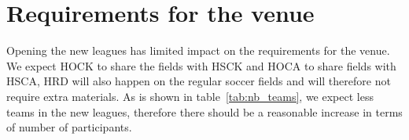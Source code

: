 \documentclass{article}
\begin{document}
\section{Requirements for the venue}

Opening the new leagues has limited impact on the requirements for the venue.
We expect HOCK to share the fields with HSCK and HOCA to share fields with HSCA,
HRD will also happen on the regular soccer fields and will therefore not require
extra materials.
As is shown in table~\ref{tab:nb_teams}, we expect less teams in the new
leagues,
therefore there should be a reasonable increase in terms of number of
participants.

\end{document}
